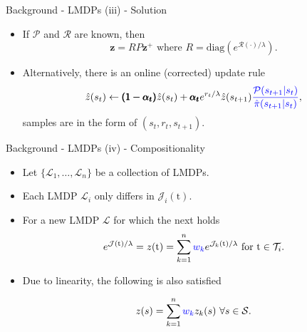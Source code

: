 \documentclass{beamer}
\theoremstyle{mystyle}
\newcommand{\tS}{\text{t}}   %
\newcommand{\cJ}{\mathcal{J}}
\newcommand{\cL}{\mathcal{L}}
\newcommand{\cP}{\mathcal{P}}
\newcommand{\cR}{\mathcal{R}}
\newcommand{\cS}{\mathcal{S}}
\newcommand{\cT}{\mathcal{T}}
\begin{document}
\begin{frame}{Background - LMDPs (iii) - Solution}
    
    \begin{itemize}
         
         \item If $\cP$ and $\cR$ are known, then \[ \mathbf{z} = R P \mathbf{z^+} \text{  where  } R=\text{diag}(e^{\cR(\cdot)/\lambda}) .\]
         \item Alternatively, there is an online {\color{blue} (corrected)} update rule  
         \[ \hat{z}(s_t) \leftarrow {\pmb{(1-\alpha_t)}} \hat{z}(s_t) + {\pmb{\alpha_t}} e^{r_t/\lambda}\hat{z}(s_{t+1}) {\color{blue} \frac {\cP(s_{t+1}|s_t)} {\hat{\pi}(s_{t+1}|s_t)}}, \]
        samples are in the form of $(s_t, r_t, s_{t+1})$.
    \end{itemize}
\end{frame}

\begin{frame}{Background - LMDPs (iv) - Compositionality}
    \begin{itemize}
    \item Let $\{\cL_1,\ldots,\cL_n\}$ be a collection of LMDPs. 
   
    \item Each LMDP $\cL_i$ {\color{blue} only differs in $\cJ_i(\tS)$}.
    
    \item For a new LMDP $\cL$ for which the next holds~\citep{TodorovNIPS2009} 
    \begin{equation*}
        e^{\cJ(\tS)/\lambda} = z(\tS) = \sum_{k=1}^n {\color{blue} w_k} e^{\cJ_k(\tS)/\lambda} \ \text{for} \ \tS \in \cT_i.
    \end{equation*}
    
    \item Due to linearity, the following is also satisfied
    
    \begin{equation*}
       z(s) =  \sum_{k=1}^n {\color{blue} w_k} z_k(s) \ \forall s \in \cS.
    \end{equation*}
    
    \end{itemize}
    
\end{frame}
\end{document}
